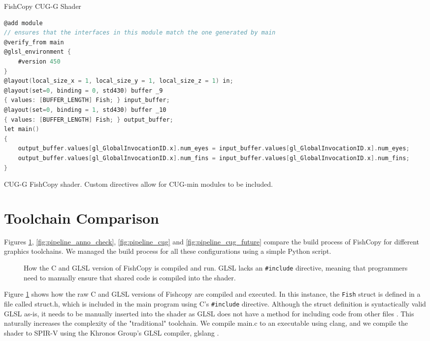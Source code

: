 \documentclass[a4paper,12pt,twoside,openright]{report}
\begin{document}
\begin{lstfloat}
\begin{center}
FishCopy CUG-G Shader
\end{center}
\begin{lstlisting}[language=C]
@add module
// ensures that the interfaces in this module match the one generated by main
@verify_from main
@glsl_environment {
    #version 450
}
@layout(local_size_x = 1, local_size_y = 1, local_size_z = 1) in;
@layout(set=0, binding = 0, std430) buffer _9
{ values: [BUFFER_LENGTH] Fish; } input_buffer;
@layout(set=0, binding = 1, std430) buffer _10
{ values: [BUFFER_LENGTH] Fish; } output_buffer;
let main()
{
    output_buffer.values[gl_GlobalInvocationID.x].num_eyes = input_buffer.values[gl_GlobalInvocationID.x].num_eyes;
    output_buffer.values[gl_GlobalInvocationID.x].num_fins = input_buffer.values[gl_GlobalInvocationID.x].num_fins;
}
\end{lstlisting}
\caption{CUG-G FishCopy shader. Custom directives allow for CUG-min modules to
be included. }
\label{lst:cug_g_shader}
\end{lstfloat}



\section{Toolchain Comparison}

\label{sec:toolchain_comparison}

Figures \ref{fig:pipeline_basic}, \ref{fig:pipeline_anno_check},
\ref{fig:pipeline_cug} and \ref{fig:pipeline_cug_future} compare the build
process of FishCopy for different graphics toolchains. We managed the build
process for all these configurations using a simple Python script.

\begin{figure}[h]
\centering
\def\svgwidth{0.8\linewidth}

\caption{How the C and GLSL version of FishCopy is compiled and run. GLSL lacks
an \texttt{\#include} directive, meaning that programmers need to manually
ensure that shared code is compiled into the shader.}
\label{fig:pipeline_basic}
\end{figure}

Figure \ref{fig:pipeline_basic} shows how the raw C and GLSL versions of
Fishcopy are compiled and executed. In this instance, the \texttt{Fish} struct
is defined in a file called struct.h, which is included in the main program
using C's \texttt{\#include} directive. Although the struct definition is
syntactically valid GLSL as-is, it needs to be manually inserted into the
shader as GLSL does not have a method for including code from other files
\cite{TODO}. This naturally increases the complexity of the "traditional"
toolchain. We compile main.c to an executable using clang, and we compile the
shader to SPIR-V using the Khronos Group's GLSL compiler, glslang \cite{TODO}.
\end{document}
